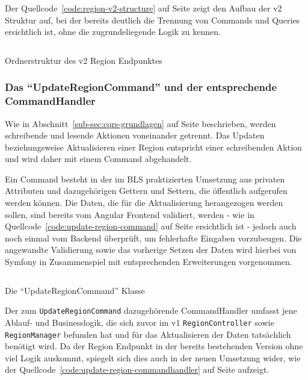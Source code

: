 \documentclass[a4paper,12pt,twoside]{scrreprt}
\begin{document}
\medskip

Der Quellcode~\ref{code:region-v2-structure} auf Seite \pageref{code:region-v2-structure} zeigt den Aufbau der v2 Struktur auf, bei der bereits deutlich die Trennung von Commands und Queries ersichtlich ist, ohne die zugrundeliegende Logik zu kennen.

\begin{listing}[ht]
    \inputminted[fontsize=\footnotesize,linenos]{text}{code/region_v2_structure.txt}
    \caption[Ordnerstruktur des v2 Region Endpunktes]{Ordnerstruktur des v2 Region Endpunktes}
    \label{code:region-v2-structure}
\end{listing}

\subsubsection{Das \enquote{UpdateRegionCommand} und der entsprechende CommandHandler}
\label{sub-sub-sec:update-region-command}
Wie in Abschnitt~\ref{sub-sec:cqrs-grundlagen} auf Seite \pageref{sub-sec:cqrs-funktionsweise} beschrieben, werden schreibende und lesende Aktionen voneinander getrennt. Das Updaten beziehungsweise Aktualisieren einer Region entspricht einer schreibenden Aktion und wird daher mit einem Command abgehandelt.

Ein Command besteht in der im BLS praktizierten Umsetzung aus privaten Attributen und dazugehörigen Gettern und Settern, die öffentlich aufgerufen werden können. Die Daten, die für die Aktualisierung herangezogen werden sollen, sind bereits vom Angular Frontend validiert, werden - wie in Quellcode~\ref{code:update-region-command} auf Seite \pageref{code:update-region-command} ersichtlich ist - jedoch auch noch einmal vom Backend überprüft, um fehlerhafte Eingaben vorzubeugen. Die angewandte Validierung sowie das vorherige Setzen der Daten wird hierbei von Symfony in Zusammenspiel mit entsprechenden Erweiterungen vorgenommen.

\begin{listing}[ht]
    \inputminted[fontsize=\footnotesize,linenos,breaklines]{php}{code/update_region_command.php}
    \caption[Die \enquote{UpdateRegionCommand} Klasse]{Die \enquote{UpdateRegionCommand} Klasse}
    \label{code:update-region-command}
\end{listing}

Der zum \texttt{UpdateRegionCommand} dazugehörende CommandHandler umfasst jene Ablauf- und Businesslogik, die sich zuvor im v1 \texttt{RegionController} sowie \texttt{RegionManager} befunden hat und für das Aktualisieren der Daten tatsächlich benötigt wird. Da der Region Endpunkt in der bereits bestehenden Version ohne viel Logik auskommt, spiegelt sich dies auch in der neuen Umsetzung wider, wie der Quellcode~\ref{code:update-region-commandhandler} auf Seite \pageref{code:update-region-commandhandler} aufzeigt.
\end{document}
